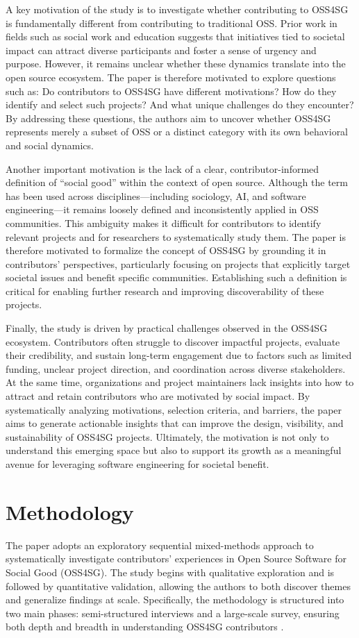 A key motivation of the study is to investigate whether contributing to OSS4SG is fundamentally different from contributing to traditional OSS. Prior work in fields such as social work and education suggests that initiatives tied to societal impact can attract diverse participants and foster a sense of urgency and purpose. However, it remains unclear whether these dynamics translate into the open source ecosystem. The paper is therefore motivated to explore questions such as: Do contributors to OSS4SG have different motivations? How do they identify and select such projects? And what unique challenges do they encounter? By addressing these questions, the authors aim to uncover whether OSS4SG represents merely a subset of OSS or a distinct category with its own behavioral and social dynamics.

Another important motivation is the lack of a clear, contributor-informed definition of “social good” within the context of open source. Although the term has been used across disciplines—including sociology, AI, and software engineering—it remains loosely defined and inconsistently applied in OSS communities. This ambiguity makes it difficult for contributors to identify relevant projects and for researchers to systematically study them. The paper is therefore motivated to formalize the concept of OSS4SG by grounding it in contributors’ perspectives, particularly focusing on projects that explicitly target societal issues and benefit specific communities. Establishing such a definition is critical for enabling further research and improving discoverability of these projects.

Finally, the study is driven by practical challenges observed in the OSS4SG ecosystem. Contributors often struggle to discover impactful projects, evaluate their credibility, and sustain long-term engagement due to factors such as limited funding, unclear project direction, and coordination across diverse stakeholders. At the same time, organizations and project maintainers lack insights into how to attract and retain contributors who are motivated by social impact. By systematically analyzing motivations, selection criteria, and barriers, the paper aims to generate actionable insights that can improve the design, visibility, and sustainability of OSS4SG projects. Ultimately, the motivation is not only to understand this emerging space but also to support its growth as a meaningful avenue for leveraging software engineering for societal benefit.

\section{Methodology}
The paper adopts an exploratory sequential mixed-methods approach to systematically investigate contributors’ experiences in Open Source Software for Social Good (OSS4SG). The study begins with qualitative exploration and is followed by quantitative validation, allowing the authors to both discover themes and generalize findings at scale. Specifically, the methodology is structured into two main phases: semi-structured interviews and a large-scale survey, ensuring both depth and breadth in understanding OSS4SG contributors .

